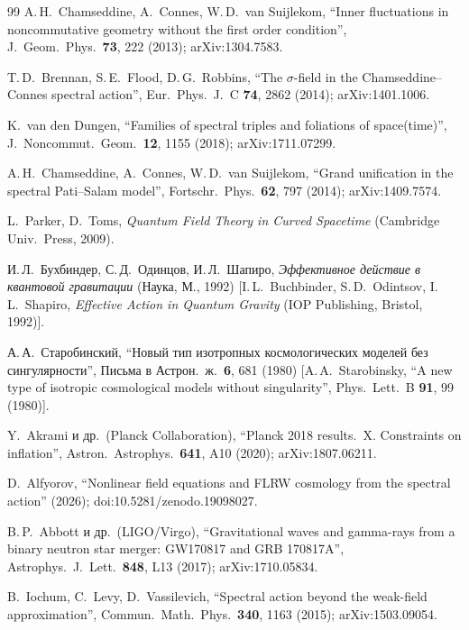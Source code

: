 \documentclass[twocolumn,10pt]{article}
\begin{document}
\begin{thebibliography}{99}
A.\,H.~Chamseddine, A.~Connes, W.\,D.~van Suijlekom,
``Inner fluctuations in noncommutative geometry without the
first order condition'',
J.\ Geom.\ Phys.\ \textbf{73}, 222 (2013);
arXiv:1304.7583.

T.\,D.~Brennan, S.\,E.~Flood, D.\,G.~Robbins,
``The $\sigma$-field in the Chamseddine--Connes spectral action'',
Eur.\ Phys.\ J.\ C \textbf{74}, 2862 (2014);
arXiv:1401.1006.

K.~van den Dungen,
``Families of spectral triples and foliations of space(time)'',
J.\ Noncommut.\ Geom.\ \textbf{12}, 1155 (2018);
arXiv:1711.07299.

A.\,H.~Chamseddine, A.~Connes, W.\,D.~van Suijlekom,
``Grand unification in the spectral Pati--Salam model'',
Fortschr.\ Phys.\ \textbf{62}, 797 (2014);
arXiv:1409.7574.

L.~Parker, D.~Toms,
\textit{Quantum Field Theory in Curved Spacetime}
(Cambridge Univ.\ Press, 2009).

И.\,Л.~Бухбиндер, С.\,Д.~Одинцов, И.\,Л.~Шапиро,
\textit{Эффективное действие в квантовой гравитации}
(Наука, М., 1992)
[I.\,L.~Buchbinder, S.\,D.~Odintsov, I.\,L.~Shapiro,
\textit{Effective Action in Quantum Gravity}
(IOP Publishing, Bristol, 1992)].

А.\,А.~Старобинский,
``Новый тип изотропных космологических моделей без сингулярности'',
Письма в Астрон.\ ж.\ \textbf{6}, 681 (1980)
[A.\,A.~Starobinsky,
``A new type of isotropic cosmological models without singularity'',
Phys.\ Lett.\ B \textbf{91}, 99 (1980)].

Y.~Akrami и др.\ (Planck Collaboration),
``Planck 2018 results.~X. Constraints on inflation'',
Astron.\ Astrophys.\ \textbf{641}, A10 (2020);
arXiv:1807.06211.

D.~Alfyorov,
``Nonlinear field equations and FLRW cosmology
from the spectral action'' (2026);
doi:10.5281/zenodo.19098027.

B.\,P.~Abbott и др.\ (LIGO/Virgo),
``Gravitational waves and gamma-rays from a binary neutron star
merger: GW170817 and GRB 170817A'',
Astrophys.\ J.\ Lett.\ \textbf{848}, L13 (2017);
arXiv:1710.05834.

B.~Iochum, C.~Levy, D.~Vassilevich,
``Spectral action beyond the weak-field approximation'',
Commun.\ Math.\ Phys.\ \textbf{340}, 1163 (2015);
arXiv:1503.09054.


\end{thebibliography}
\end{document}
